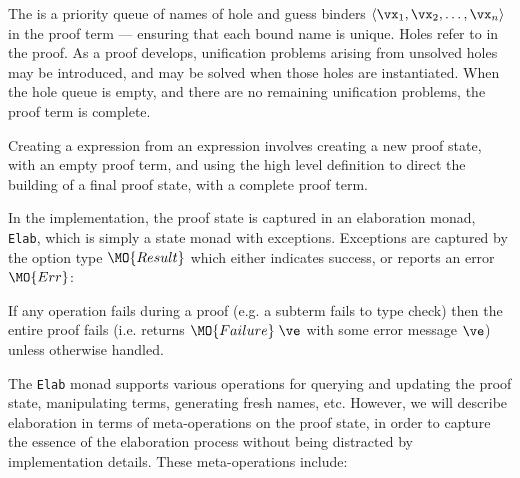 The  is a priority queue of names of hole and guess binders 
$\langle\vx_1,\vx_2,\ldots,\vx_n\rangle$
in the proof term ---
ensuring that each bound name is unique. Holes refer to 
in the proof. As a proof develops, unification problems arising from unsolved
holes may be introduced, and may be solved when those holes are instantiated.
When the hole queue is empty, and there are no remaining unification 
problems, the proof term is complete.

Creating a \TT{} expression from an \Idris{} expression involves creating
a new proof state, with an empty proof term, and using the high level definition
to direct the building of a final proof state, with a complete proof term.

In the implementation, the proof state is captured in an elaboration monad,
\texttt{Elab}, which is simply a state monad with exceptions. 
Exceptions are captured by the option type $\MO{Result}$ which
either indicates success, or reports an error $\MO{Err}$:


\noindent
If any operation fails during a proof (e.g. a subterm fails to type check)
then the entire proof fails (i.e. returns $\MO{Failure}\;\ve$ with some error
message $\ve$) unless otherwise handled.

The \texttt{Elab} monad supports various operations for querying and updating
the proof state, manipulating terms, generating fresh names, etc. However, we
will describe \Idris{} elaboration in terms of meta-operations on the proof
state, in order to capture the essence of the elaboration process without being
distracted by implementation details. These meta-operations include: 

